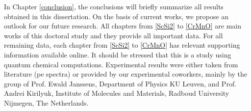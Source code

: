 \begin{refsection}
In Chapter \ref{conclusion}, the conclusions will briefly summarize all results obtained in this dissertation. On the basis of current works, we propose an outlook for our future research. All chapters from \ref{ScSi2} to \ref{CrMnO} are main works of this doctoral study and they provide all important data. For all remaining data, each chapter from \ref{ScSi2} to \ref{CrMnO} has relevant supporting information available online. It should be stressed that this is a study using quantum chemical computations. Experimental results were either taken from literature (\acrshort{pe} spectra) or provided by our experimental coworkers, mainly by the group of Prof. Ewald Janssens, Department of Physics KU Leuven, and Prof. Andrei Kirilyuk, Institute of Molecules and Materials, Radboud University Nijmegen, The Netherlands. 






\printbibliography[heading=subbibliography] %

\end{refsection}


